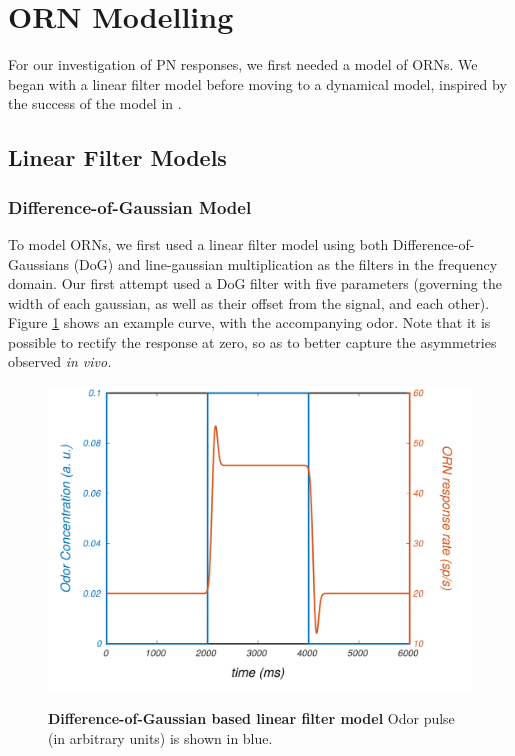 \documentclass[a4paper,12pt,twoside]{article}
\begin{document}
\section{ORN Modelling}
For our investigation of PN responses, we first needed a model of ORNs.  We began with a linear filter model before moving to a dynamical model, inspired by the success of the model in \citet{Nagel2011}.
\subsection{Linear Filter Models}
\subsubsection{Difference-of-Gaussian Model}
To model ORNs, we first used a linear filter model using both Difference-of-Gaussians (DoG) and line-gaussian multiplication as the filters in the frequency domain.  Our first attempt used a DoG filter with five parameters (governing the width of each gaussian, as well as their offset from the signal, and each other). Figure \ref{fig:orn1} shows an example curve, with the accompanying odor.  Note that it is possible to rectify the response at zero, so as to better capture the asymmetries observed \textit{in vivo.}

\begin{figure}
\centering
\caption{\textbf{Difference-of-Gaussian based linear filter model} Odor pulse (in arbitrary units) is shown in blue.}
\hspace*{-1.25cm}\includegraphics[scale=0.6]{2016-06-17ModelORNresponse.png}
\label{fig:orn1}
\end{figure}
\end{document}
